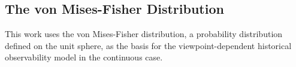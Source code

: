 \subsection{The von Mises-Fisher Distribution}

This work uses the von Mises-Fisher distribution, a probability distribution defined on the unit sphere, as the basis for the viewpoint-dependent historical observability model in the continuous case.